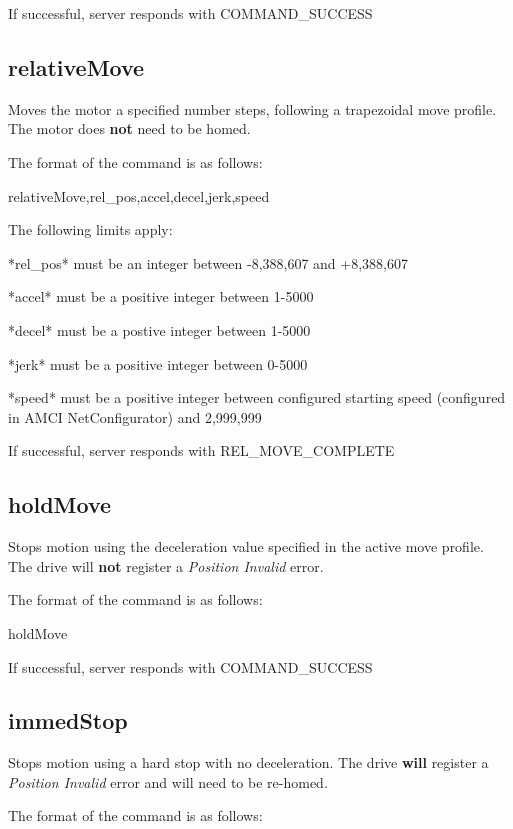 If successful, server responds with {\ttfamily C\+O\+M\+M\+A\+N\+D\+\_\+\+S\+U\+C\+C\+E\+S\+S}\hypertarget{index_relativeMove}{}\subsection{relative\+Move}\label{index_relativeMove}
Moves the motor a specified number steps, following a trapezoidal move profile. The motor does {\bfseries not} need to be homed.

The format of the command is as follows\+:

{\ttfamily relative\+Move,rel\+\_\+pos,accel,decel,jerk,speed}

The following limits apply\+: \begin{DoxyVerb}*rel_pos* must be an integer between -8,388,607 and +8,388,607

*accel* must be a positive integer between 1-5000

*decel* must be a postive integer between 1-5000

*jerk* must be a positive integer between 0-5000

*speed* must be a positive integer between configured starting speed (configured in AMCI NetConfigurator) and 2,999,999
\end{DoxyVerb}


If successful, server responds with {\ttfamily R\+E\+L\+\_\+\+M\+O\+V\+E\+\_\+\+C\+O\+M\+P\+L\+E\+T\+E}\hypertarget{index_holdMove}{}\subsection{hold\+Move}\label{index_holdMove}
Stops motion using the deceleration value specified in the active move profile. The drive will {\bfseries not} register a {\itshape Position Invalid} error.

The format of the command is as follows\+:

{\ttfamily hold\+Move}

If successful, server responds with {\ttfamily C\+O\+M\+M\+A\+N\+D\+\_\+\+S\+U\+C\+C\+E\+S\+S}\hypertarget{index_immedStop}{}\subsection{immed\+Stop}\label{index_immedStop}
Stops motion using a hard stop with no deceleration. The drive {\bfseries will} register a {\itshape Position Invalid} error and will need to be re-\/homed.

The format of the command is as follows\+:

